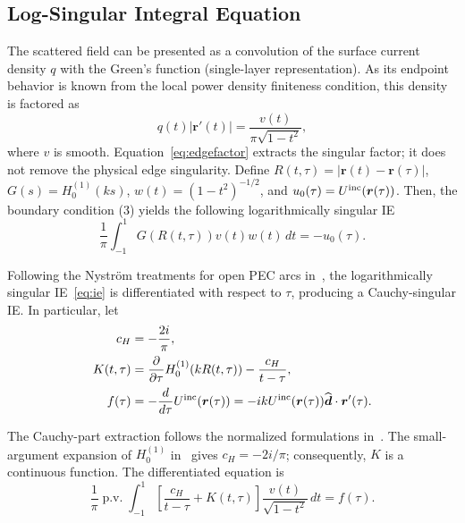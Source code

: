 \documentclass[conference]{IEEEtran}
\begin{document}
\subsection{Log-Singular Integral Equation}

The scattered field can be presented as a convolution of the surface current
density $q$ with the Green's function (single-layer representation).  As its 
endpoint behavior is known from the local 
power density finiteness condition, this density is factored as
\begin{equation}
 q(t)|\boldsymbol r'(t)|
 =\frac{v(t)}{\pi\sqrt{1-t^2}},
 \label{eq:edgefactor}
\end{equation}
where $v$ is smooth.  Equation~\eqref{eq:edgefactor} extracts the singular
factor; it does not remove the physical edge singularity.  Define
$R(t,\tau)=|\boldsymbol r(t)-\boldsymbol r(\tau)|$,
$G(s)=H_0^{(1)}(ks)$, $w(t)=(1-t^2)^{-1/2}$, and
$u_0(\tau)=U^{\rm inc}(\boldsymbol r(\tau))$.  Then, the boundary condition (3)
yields the following logarithmically singular IE
\begin{equation}
 \frac{1}{\pi}\int_{-1}^{1}G(R(t,\tau))v(t)w(t)\,dt=-u_0(\tau).
 \label{eq:ie}
\end{equation}

Following the Nystr\"om treatments for open PEC arcs
in~\cite{nosich2005,nosich2007,gandel2010}, the logarithmically singular
IE~\eqref{eq:ie} is differentiated with respect to $\tau$, producing a
Cauchy-singular IE.  In particular, let
\begin{align}
 c_H&=-\frac{2i}{\pi},                                                   \label{eq:ch}\\
 K(t,\tau)&=\frac{\partial}{\partial\tau}
 H_0^{(1)}\!\left(kR(t,\tau)\right)-\frac{c_H}{t-\tau},                 \label{eq:kernel}\\
 f(\tau)&=-\frac{d}{d\tau}U^{\rm inc}(\boldsymbol r(\tau))
 =-ikU^{\rm inc}(\boldsymbol r(\tau))
 \widehat{\boldsymbol d}\mathbin{\cdot}\boldsymbol r'(\tau).
 \label{eq:rhs}
\end{align}

The Cauchy-part extraction follows the normalized formulations
in~\cite{nosich2005,nosich2007}.  The
small-argument expansion of $H_0^{(1)}$ in~\cite{shapoval2011} gives
$c_H=-2i/\pi$; consequently, $K$ is a continuous function.  The
differentiated equation is
\begin{equation}
 \frac{1}{\pi}\operatorname{p.v.}\!\int_{-1}^{1}
 \left[\frac{c_H}{t-\tau}+K(t,\tau)\right]
 \frac{v(t)}{\sqrt{1-t^2}}\,dt=f(\tau).
 \label{eq:cauchyie}
\end{equation}
\end{document}
